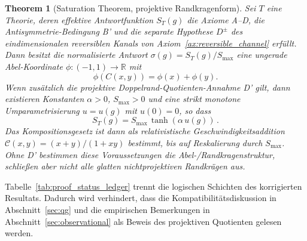 \documentclass[aps,prd,twocolumn,superscriptaddress,nofootinbib]{revtex4-2}
\newtheorem{theorem}{Theorem}
\begin{document}
\begin{theorem}[Saturation Theorem, projektive Randkragenform]
\label{thm:saturation}
Sei $T$ eine Theorie, deren effektive Antwortfunktion $S_T(g)$ die Axiome A--D, die Antisymmetrie-Bedingung B' und die separate Hypothese $D^\pm$ des eindimensionalen reversiblen Kanals von Axiom~\ref{ax:reversible_channel} erfüllt. Dann besitzt die normalisierte Antwort $\sigma(g)=S_T(g)/S_{\max}$ eine ungerade Abel-Koordinate $\phi:(-1,1)\to\mathbb{R}$ mit
\[
  \phi(C(x,y))=\phi(x)+\phi(y).
\]
Wenn zusätzlich die projektive Doppelrand-Quotienten-Annahme D' gilt, dann existieren Konstanten $\alpha > 0$, $S_{\max} > 0$ und eine strikt monotone Umparametrisierung $u = u(g)$ mit $u(0) = 0$, so dass
\begin{equation}
S_T(g) = S_{\max}\,\tanh\!\left(\alpha\,u(g)\right)\,.
\label{eq:saturation_form}
\end{equation}
Das Kompositionsgesetz ist dann als relativistische Geschwindigkeitsaddition $\mathcal{C}(x,y) = (x+y)/(1+xy)$ bestimmt, bis auf Reskalierung durch $S_{\max}$. Ohne D' bestimmen diese Voraussetzungen die Abel-/Randkragenstruktur, schließen aber nicht alle glatten nichtprojektiven Randkrägen aus.
\end{theorem}

Tabelle~\ref{tab:proof_status_ledger} trennt die logischen Schichten des korrigierten Resultats. Dadurch wird verhindert, dass die Kompatibilitätsdiskussion in Abschnitt~\ref{sec:qg} und die empirischen Bemerkungen in Abschnitt~\ref{sec:observational} als Beweis des projektiven Quotienten gelesen werden.
\end{document}
